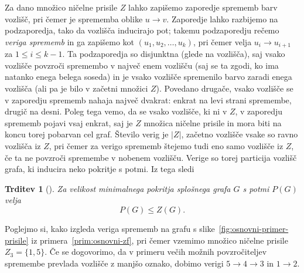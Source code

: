 \documentclass[12pt,a4paper,twoside]{article}
\theoremstyle{definition} %
\theoremstyle{plain} %
\newtheorem{trditev}[definicija]{Trditev}
\numberwithin{equation}{section}  %
\begin{document}
Za dano množico ničelne prisile $Z$ lahko zapišemo zaporedje sprememb barv vozlišč, pri čemer je sprememba oblike $u \rightarrow v$. Zaporedje lahko razbijemo na podzaporedja, tako da vozlišča inducirajo pot; takemu podzaporedju rečemo \emph{veriga sprememb} in ga zapišemo kot $(u_1, u_2, \ldots, u_k)$, pri čemer velja $u_i \rightarrow u_{i+1}$ za $1 \leq i \leq k-1$.  Ta podzaporedja so disjunktna (glede na vozlišča), saj vsako vozlišče povzroči spremembo v največ enem vozlišču (saj se ta zgodi, ko ima natanko enega belega soseda) in je vsako vozlišče spremenilo barvo zaradi enega vozlišča (ali pa je bilo v začetni množici $Z$). Povedano drugače, vsako vozlišče se v zaporedju sprememb nahaja največ dvakrat: enkrat na levi strani spremembe, drugič na desni. Poleg tega vemo, da se vsako vozlišče, ki ni v $Z$, v zaporedju sprememb pojavi vsaj enkrat, saj je $Z$ množica ničelne prisile in mora biti na koncu torej pobarvan cel graf. Število verig je $|Z|$, začetno vozlišče vsake so ravno vozlišča iz $Z$, pri čemer za verigo sprememb štejemo tudi eno samo vozlišče iz $Z$, če ta ne povzroči spremembe v nobenem vozlišču. Verige so torej particija vozlišč grafa, ki inducira neko pokritje s potmi. Iz tega sledi
\begin{trditev}[{\cite[trditev~2.10]{barioli2010zero}}]
    Za velikost minimalnega pokritja splošnega grafa $G$ s potmi $P(G)$ velja
    \[ P(G) \leq Z(G) .\]
\end{trditev}
Poglejmo si, kako izgleda veriga sprememb na grafu s slike~\ref{fig:osnovni-primer-prisile} iz primera~\ref{prim:osnovni-zf}, pri čemer vzemimo množico ničelne prisile $Z_3 = \{1,5\}$. Če se dogovorimo, da v primeru večih možnih povzročiteljev spremembe prevlada vozlišče z manjšo oznako, dobimo verigi $5 \rightarrow 4 \rightarrow 3$ in $1 \rightarrow 2$.
\end{document}
